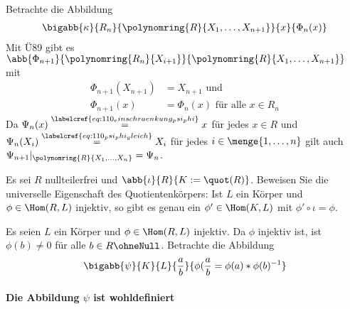 \begin{uebungsblatt}
\begin{loesung}
		Betrachte die Abbildung 
		\begin{align}
			\bigabb{\kappa}{R_n}{\polynomring{R}{X_1, \dots, X_{n+1}}}{x}{\Phi_n(x)} \label{eq: 110_def_kappa}
		\end{align}
		Mit Ü89 gibt es $\abb{\Phi_{n+1}}{\polynomring{R_n}{X_{i+1}}}{\polynomring{R}{X_1, \dots, X_{n+1}}}$ mit 
		\begin{subequations}
			\begin{align}
				\Phi_{n+1}(X_{n+1}) &= X_{n+1} \text{ und} \label{eq: 110_eig_phi_n+1_poly} \\
				\Phi_{n+1}(x)       &= \Phi_n(x) \text{ für alle } x \in R_n \label{eq: 110_eig_phi_n+1_x}
			\end{align}
		\end{subequations}
		Da $\Psi_n(x) \stackrel{\labelcref{eq: 110_einschraenkung_psi_phi}}{=} x$ für jedes $x \in R$ und $\Psi_n(X_i) \stackrel{\labelcref{eq: 110_psi_phi_gleich}}{=} X_i$ für jedes $i \in \menge{1, \dots, n}$ gilt auch $\Psi_{n+1} |_{\polynomring{R}{X_1, \dots, X_n}} = \Psi_n$.
		
	\end{loesung}
		
	\begin{uebung}
		Es sei $R$ nullteilerfrei und $\abb{\iota}{R}{K:= \quot(R)}$. Beweisen Sie die universelle Eigenschaft des Quotientenkörpers: Ist $L$ ein Körper und $\phi \in \Hom(R,L)$ injektiv, so gibt es genau ein $\phi' \in \Hom(K,L)$ mit $\phi' \circ \iota = \phi$.
	\end{uebung}
	\begin{loesung}
		Es seien $L$ ein Körper und $\phi \in \Hom(R, L)$ injektiv. Da $\phi$ injektiv ist, ist $\phi(b) \neq 0$ für alle $b \in R\ohneNull$. Betrachte die Abbildung
		\begin{align*}
			\bigabb{\psi}{K}{L}{\frac{a}{b}}{\phi(\frac{a}{b} = \phi(a) * \phi(b)^{-1}}
		\end{align*}
		\paragraph{Die Abbildung $\psi$ ist wohldefiniert} 
	\end{loesung}

\end{uebungsblatt}